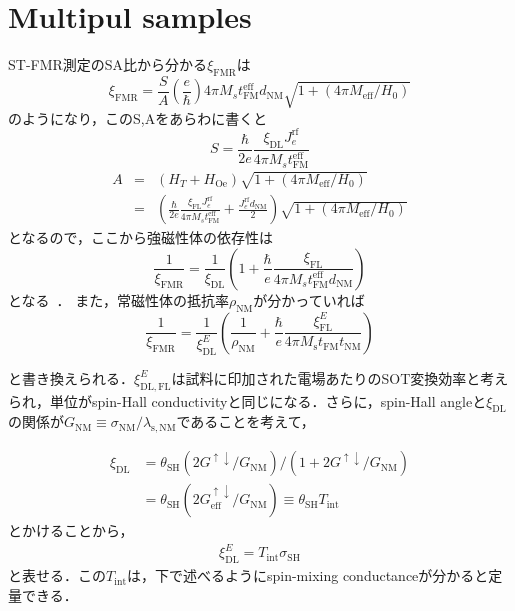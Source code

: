 \documentclass[11pt]{jbook}
\begin{document}
\section{Multipul samples}

ST-FMR測定のSA比から分かる$\xi_\mathrm{FMR}$は
\begin{equation}
\xi_{\mathrm{FMR}}=\frac{S}{A}\left(\frac{e}{\hbar}\right) 4 \pi M_{s} t_{\mathrm{FM}}^{\mathrm{eff}} d_{\mathrm{NM}} \sqrt{1+\left(4 \pi M_{\mathrm{eff}} / H_{0}\right)}
\end{equation}
のようになり，このS,Aをあらわに書くと
\begin{equation}
S=\frac{\hbar}{2 e} \frac{\xi_{\mathrm{DL}} J_{e}^{\mathrm{rf}}}{4 \pi M_{s} t_{\mathrm{FM}}^{\mathrm{eff}}}
\end{equation}
\begin{eqnarray}
A &=&\nonumber \left(H_{T}+H_{\mathrm{Oe}}\right) \sqrt{1+\left(4 \pi M_{\mathrm{eff}} / H_{0}\right)} \\
&=&\left(\frac{\hbar}{2 e} \frac{\xi_{\mathrm{FL}} J_{e}^{\mathrm{rf}}}{4 \pi M_{s} t_{\mathrm{FM}}^{\mathrm{eff}}}+\frac{J_{e}^{\mathrm{rf}} d_{\mathrm{NM}}}{2}\right) \sqrt{1+\left(4 \pi M_{\mathrm{eff}} / H_{0}\right)}
\end{eqnarray}
となるので，ここから強磁性体の依存性は
\begin{equation}
\frac{1}{\xi_{\mathrm{FMR}}}=\frac{1}{\xi_{\mathrm{DL}}}\left(1+\frac{\hbar}{e} \frac{\xi_{\mathrm{FL}}}{4 \pi M_{s} t_{\mathrm{FM}}^{\mathrm{eff}} d_{\mathrm{NM}}}\right)
\end{equation}
となる~\cite{PhysRevB.92.064426}．
また，常磁性体の抵抗率$\rho_\mathrm{NM}$が分かっていれば
\begin{equation}
\frac{1}{\xi_{\mathrm{FMR}}}=\frac{1}{\xi_{\mathrm{DL}}^{E}}\left(\frac{1}{\rho_{\mathrm{NM}}}+\frac{\hbar}{e} \frac{\xi_{\mathrm{FL}}^{E}}{4 \pi M_{\mathrm{s}} t_{\mathrm{FM}} t_{\mathrm{NM}}}\right)
\end{equation}

と書き換えられる．$\xi_{\mathrm{DL,FL}}^{E}$は試料に印加された電場あたりのSOT変換効率と考えられ，単位がspin-Hall conductivityと同じになる．さらに，spin-Hall angleと$\xi_\mathrm{DL}$の関係が$G_{\mathrm{NM}} \equiv \sigma_{\mathrm{NM}} / \lambda_{\mathrm{s}, \mathrm{NM}}$であることを考えて，

\begin{eqnarray}
\xi_{\mathrm{DL}} &=\nonumber \theta_{\mathrm{SH}}\left(2 G^{\uparrow \downarrow} / G_{\mathrm{NM}}\right) /\left(1+2 G^{\uparrow \downarrow} / G_{\mathrm{NM}}\right) \\
&=\theta_{\mathrm{SH}}\left(2 G_{\mathrm{eff}}^{\uparrow \downarrow} / G_{\mathrm{NM}}\right) \equiv \theta_{\mathrm{SH}} T_{\mathrm{int}}
\end{eqnarray}
とかけることから，
\begin{eqnarray}
\xi_\mathrm{DL}^E = T_\mathrm{int}\sigma_\mathrm{SH}	
\end{eqnarray}
と表せる．この$T_\mathrm{int}$は，下で述べるようにspin-mixing conductanceが分かると定量できる．\\
\end{document}
